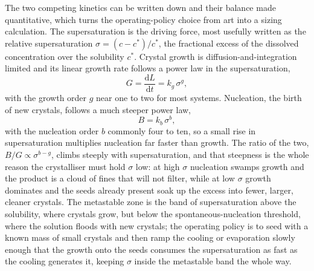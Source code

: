 The two competing kinetics can be written down and their balance made
quantitative, which turns the operating-policy choice from art into a sizing
calculation. The supersaturation is the driving force, most usefully written
as the relative supersaturation $\sigma = (c - c^{*})/c^{*}$, the fractional
excess of the dissolved concentration over the solubility $c^{*}$. Crystal
growth is diffusion-and-integration limited and its linear growth rate
follows a power law in the supersaturation,
\[
G = \frac{\mathrm{d}L}{\mathrm{d}t} = k_g\,\sigma^{g},
\]
with the growth order $g$ near one to two for most systems. Nucleation, the
birth of new crystals, follows a much steeper power law,
\[
B = k_b\,\sigma^{b},
\]
with the nucleation order $b$ commonly four to ten, so a small rise in
supersaturation multiplies nucleation far faster than growth. The ratio of
the two, $B/G \propto \sigma^{b-g}$, climbs steeply with supersaturation, and
that steepness is the whole reason the crystalliser must hold $\sigma$ low: at
high $\sigma$ nucleation swamps growth and the product is a cloud of fines
that will not filter, while at low $\sigma$ growth dominates and the seeds
already present soak up the excess into fewer, larger, cleaner crystals. The
metastable zone is the band of supersaturation above the solubility, where
crystals grow, but below the spontaneous-nucleation threshold, where the
solution floods with new crystals; the operating policy is to seed with a
known mass of small crystals and then ramp the cooling or evaporation slowly
enough that the growth onto the seeds consumes the supersaturation as fast as
the cooling generates it, keeping $\sigma$ inside the metastable band the
whole way.

